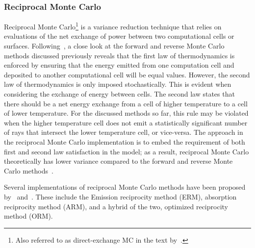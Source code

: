 
\subsubsection{Reciprocal Monte Carlo}
Reciprocal Monte Carlo\footnote{Also referred to as direct-exchange MC in the text by~\citet{Modest2022ChapterMediac}.} is a variance reduction technique that relies on evaluations of the net exchange of power between two computational cells or surfaces.
Following~\citet{Howell2020ThermalTransfer}, a close look at the forward and reverse Monte Carlo methods discussed previously reveals that the first law of thermodynamics is enforced by ensuring that the energy emitted from one computation cell and deposited to another computational cell will be equal values. However, the second law of thermodynamics is only imposed stochastically. This is evident when considering the exchange of energy between cells. The second law states that there should be a net energy exchange from a cell of higher temperature to a cell of lower temperature. For the discussed methods so far, this rule may be violated when the higher temperature cell does not emit a statistically significant number of rays that intersect the lower temperature cell, or vice-versa.
The approach in the reciprocal Monte Carlo implementation is to embed the requirement of both first and second law satisfaction in the model; as a result, reciprocal Monte Carlo theoretically has lower variance compared to the forward and reverse Monte Carlo methods~\cite{Howell2020ThermalTransfer}. 

Several implementations of reciprocal Monte Carlo methods have been proposed by~\citet{Tesse2002RadiativeApproach} and~\citet{Dupoirieux2006AnThicknesses}. These include the Emission reciprocity method (ERM), absorption reciprocity method (ARM), and a hybrid of the two, optimized reciprocity method (ORM).

